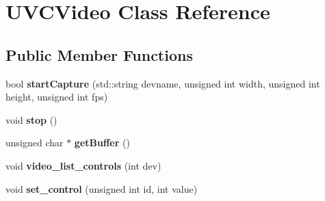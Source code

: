 \hypertarget{classUVCVideo}{\section{U\-V\-C\-Video Class Reference}
\label{classUVCVideo}
}
\subsection*{Public Member Functions}
\begin{DoxyCompactItemize}
\item 
\hypertarget{classUVCVideo_ab10bd2aebb70fddc0b5eb92ae9193b66}{bool {\bfseries start\-Capture} (std\-::string devname, unsigned int width, unsigned int height, unsigned int fps)}\label{classUVCVideo_ab10bd2aebb70fddc0b5eb92ae9193b66}

\item 
\hypertarget{classUVCVideo_a3d846311f13d549ed49a1ac2a72d7054}{void {\bfseries stop} ()}\label{classUVCVideo_a3d846311f13d549ed49a1ac2a72d7054}

\item 
\hypertarget{classUVCVideo_a950626d7ad482c9001ec1d07b25fe636}{unsigned char $\ast$ {\bfseries get\-Buffer} ()}\label{classUVCVideo_a950626d7ad482c9001ec1d07b25fe636}

\item 
\hypertarget{classUVCVideo_a00909409a4eafc881ee10d569d8531f5}{void {\bfseries video\-\_\-list\-\_\-controls} (int dev)}\label{classUVCVideo_a00909409a4eafc881ee10d569d8531f5}

\item 
\hypertarget{classUVCVideo_a98fa8a448c8ae97080e5f424a4c2e7f6}{void {\bfseries set\-\_\-control} (unsigned int id, int value)}\label{classUVCVideo_a98fa8a448c8ae97080e5f424a4c2e7f6}

\end{DoxyCompactItemize}
